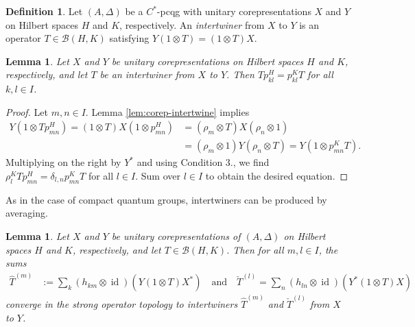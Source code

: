 \documentclass[11pt]{article}
\DeclareMathOperator{\id}{id}
\newtheorem{Lem}[Theorem]{Lemma}
\theoremstyle{definition}
\newtheorem{Def}[Theorem]{Definition}
\numberwithin{equation}{section}
\begin{document}
\begin{Def}
  Let $(A,\Delta)$ be a $C^{*}$-pcqg with unitary corepresentations
  $X$ and $Y$ on Hilbert spaces $H$ and $K$, respectively. An
  \emph{intertwiner} from $X$ to $Y$ is an operator $T\in
  \mathcal{B}(H,K)$ satisfying $Y(1\otimes T)=(1 \otimes T)X$.
\end{Def}
\begin{Lem} \label{lem:intertwiner-graded}
  Let $X$ and $Y$ be unitary corepresentations on Hilbert spaces $H$ and $K$, respectively, and let
  $T$ be an \emph{intertwiner} from $X$ to $Y$. Then $Tp^{H}_{kl} = p^{K}_{kl}T$ for all $k,l\in I$.
\end{Lem}
\begin{proof}
Let $m,n\in I$. Lemma \ref{lem:corep-intertwine} implies
\begin{align*}
  Y(1\otimes Tp^{H}_{mn}) = (1\otimes T)X(1\otimes p^{H}_{mn}) &= (\rho_{m} \otimes T)X(\rho_{n}
  \otimes 1) \\ &= (\rho_{m} \otimes 1)Y( \rho_{n}\otimes T) = Y(1 \otimes p^{K}_{mn}T).
\end{align*}
Multiplying on the right by $Y^{*}$ and using Condition 3., we find
$\rho^{K}_{l}Tp^{H}_{mn}  = \delta_{l,n} p^{K}_{mn}T$ for all $l \in I$. Sum over $l\in I$ to obtain
the desired equation.
\end{proof}
As in the case of compact quantum groups, intertwiners can be produced
by averaging.
\begin{Lem} \label{lem:intertwiner-averaged}
  Let $X$ and $Y$ be unitary corepresentations of $(A,\Delta)$ on Hilbert spaces $H$ and $K$,
  respectively, and let $T \in \mathcal{B}(H,K)$. Then for all $m,l \in I$, the sums
  \begin{align*}
    \hat T^{(m)} &:= \sum_{k} (h_{km} \otimes \id)(Y(1 \otimes T)X^{*}) \quad \text{and} \quad
    \check T^{(l)}=\sum_{n} (h_{ln}\otimes \id)(Y^{*}(1 \otimes T)X)
  \end{align*}
converge in the strong operator topology to intertwiners $\hat T^{(m)}$ and $\check T^{(l)}$ from $X$ to
$Y$.
\end{Lem}
\end{document}
